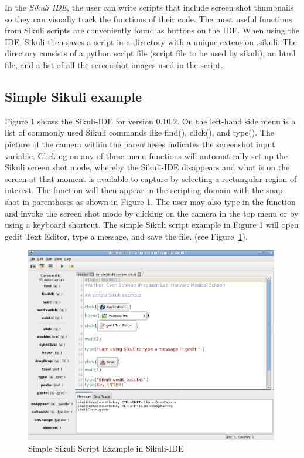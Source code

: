 \documentclass{InsightArticle}
\begin{document}
In the \emph{Sikuli IDE}, the user can write scripts that include screen shot
thumbnails so they can visually track the functions of their code. The most
useful functions from Sikuli scripts are conveniently found as
buttons on the IDE. When using the IDE, Sikuli then saves a script in a
directory with a unique extension .sikuli. The directory consists of a python
script file (script file to be used by sikuli), an html file, and a list of all
the screenshot images used in the script.


\subsection{Simple Sikuli example} %

Figure 1 shows the Sikuli-IDE for version 0.10.2.  On the left-hand side menu is a list
of commonly used Sikuli commands like find(), click(), and type().  The picture of
the camera within the parentheses indicates the screenshot input variable.  Clicking
on any of these menu functions will automatically set up the Sikuli screen shot mode, whereby
the Sikuli-IDE disappears and what is on the screen at that moment is available to capture 
by selecting a rectangular region of interest.  The function will then appear in the scripting domain
with the snap shot in parentheses as shown in Figure 1.  The user may also type in the function
and invoke the screen shot mode by clicking on the camera in the top menu or by using a
keyboard shortcut. The simple Sikuli script example in Figure 1 will open gedit Text Editor, type a message,
and save the file. (see Figure~\ref{fig:SimpleExample}).

\begin{figure}[htbp]
 \centering
 \includegraphics[width=0.99\textwidth]{Images/SimpleSikuliExample.png}
 \caption{Simple Sikuli Script Example in Sikuli-IDE}
 \label{fig:SimpleExample}
\end{figure}
\end{document}
